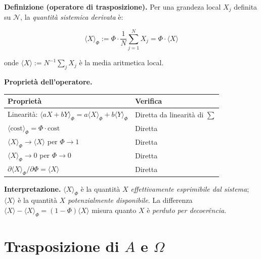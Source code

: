 \Hypoth{} \textbf{Definizione (operatore di trasposizione).} Per una
grandeza local \(X_j\) definita su \(\mathcal{N}\), la \emph{quantità
sistemica derivata} è:

\[
\langle X \rangle_\Phi := \Phi \cdot \frac{1}{N} \sum_{j=1}^{N} X_j = \Phi \cdot \langle X \rangle
\]

onde \(\langle X \rangle := N^{-1} \sum_j X_j\) è la media aritmetica
local.

\Proved{} \textbf{Proprietà dell'operatore.}

{\def\LTcaptype{none} %
{\small\begin{longtable}[]{@{}
  >{\raggedright\arraybackslash}p{}
  >{\raggedright\arraybackslash}p{}@{}}
\toprule\noalign{}
\begin{minipage}[b]{\linewidth}\raggedright
Proprietà
\end{minipage} & \begin{minipage}[b]{\linewidth}\raggedright
Verifica
\end{minipage} \\
\midrule\noalign{}
\endhead
\bottomrule\noalign{}
\endlastfoot
Linearità:
\(\langle aX + bY \rangle_\Phi = a\langle X\rangle_\Phi + b\langle Y\rangle_\Phi\)
& Diretta da linearità di \(\sum\) \\
\(\langle\text{cost}\rangle_\Phi = \Phi \cdot \text{cost}\) & Diretta \\
\(\langle X \rangle_\Phi \to \langle X \rangle\) per \(\Phi \to 1\) &
Diretta \\
\(\langle X \rangle_\Phi \to 0\) per \(\Phi \to 0\) & Diretta \\
\(\partial \langle X \rangle_\Phi / \partial \Phi = \langle X \rangle\)
& Diretta \\
\end{longtable}}
}

\Hypoth{} \textbf{Interpretazione.} \(\langle X \rangle_\Phi\) è la
quantità \(X\) \emph{effettivamente esprimibile dal sistema};
\(\langle X \rangle\) è la quantità \(X\) \emph{potenzialmente
disponibile}. La differenza
\(\langle X \rangle - \langle X \rangle_\Phi = (1-\Phi)\langle X \rangle\)
misura quanto \(X\) è \emph{perduto per decoerência}.



\section{\texorpdfstring{Trasposizione di \(A\) e
\(\Omega\)}{Trasposizione di A e \textbackslash Omega}}\label{trasposizione-di-a-e-omega}

